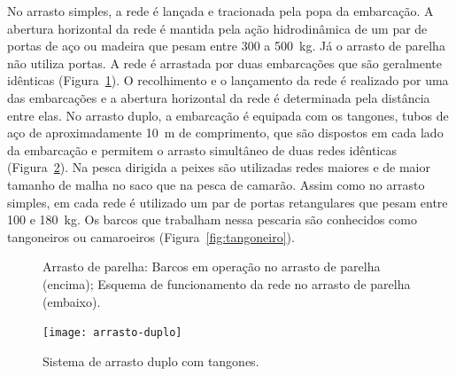 \documentclass[a4paper,11pt,twoside,showtrims,onecolumn,openright,final]{memoir}
\begin{document}
No arrasto simples, a rede é lançada e tracionada pela popa da embarcação. A abertura horizontal 
da rede é mantida pela ação hidrodinâmica de um par de portas de aço ou madeira que pesam 
entre 300 a 500~kg. Já o arrasto de parelha não utiliza portas. A rede é arrastada 
por duas embarcações que são geralmente idênticas (Figura~\ref{fig:parelha}). 
O recolhimento e o lançamento da rede é realizado por uma das embarcações e a abertura horizontal 
da rede é determinada pela distância entre elas. No arrasto duplo, a embarcação 
é equipada com os tangones, tubos de aço de aproximadamente 10~m de comprimento, que são 
dispostos em cada lado da embarcação e permitem o arrasto simultâneo de duas 
redes idênticas (Figura~\ref{fig:arrasto-duplo}). Na  pesca dirigida a peixes são 
utilizadas redes maiores e de maior tamanho de malha no saco que na pesca de camarão. 
Assim como no arrasto simples, em cada rede é utilizado um par de portas retangulares 
que pesam entre 100 e 180~kg. Os barcos que trabalham nessa pescaria são 
conhecidos como tangoneiros ou camaroeiros (Figura~\ref{fig:tangoneiro}).

%
%

\begin{figure}
\begin{center}
\end{center}
\caption[Arrasto de parelha.]
        {Arrasto de parelha:
         Barcos em operação no arrasto de parelha (encima);
         Esquema de funcionamento da rede no arrasto de parelha (embaixo).}
\label{fig:parelha}
\end{figure}


%
%

\begin{figure}
\begin{center}
\texttt{[image: arrasto-duplo]}
\end{center}
\caption{Sistema de arrasto duplo com tangones.}
\label{fig:arrasto-duplo}
\end{figure}


%
%
\end{document}
